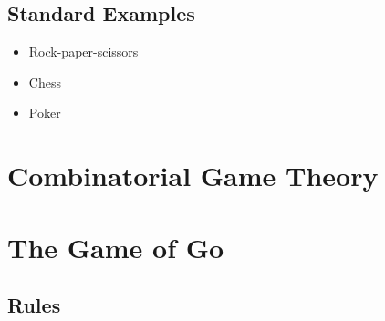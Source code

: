\subsection{Standard Examples}

\todo %

\begin{itemize}
  \item{Rock-paper-scissors}
  \item{Chess}
  \item{Poker}
\end{itemize}

\section{Combinatorial Game Theory}
\label{sec:CGT}

\todo

\section{The Game of Go}
\label{sec:Go}

\subsection{Rules}

